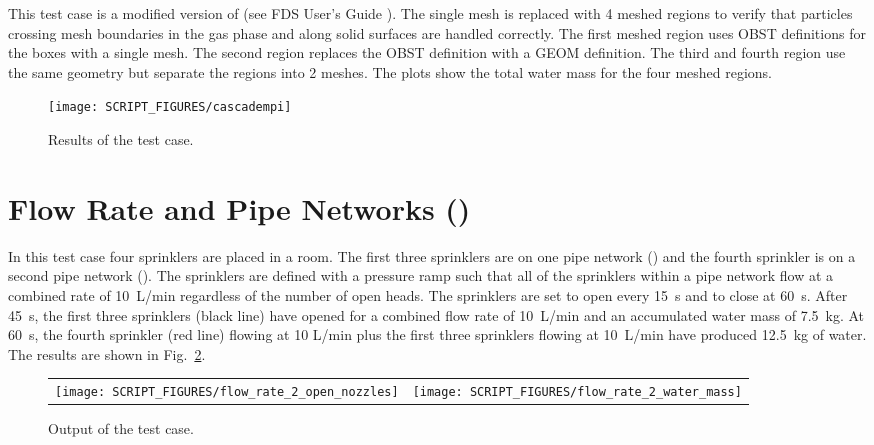 \documentclass[11pt]{book}
\begin{document}
This test case is a modified version of  (see FDS User's Guide \cite{FDS_Users_Guide}). The single mesh is replaced with 4 meshed regions to verify that particles crossing mesh boundaries in the gas phase and along solid surfaces are handled correctly. The first meshed region uses OBST definitions for the boxes with a single mesh. The second region replaces the OBST definition with a GEOM definition. The third and fourth region use the same geometry but separate the regions into 2 meshes. The plots show the total water mass for the four meshed regions.

\begin{figure}[ht]
\centering
\texttt{[image: SCRIPT\_FIGURES/cascadempi]}
\caption[Results of the  test case]{Results of the  test case.}
\label{cascadempi_image}
\end{figure}



\section{Flow Rate and Pipe Networks (\texorpdfstring{{}}{flow\_rate\_2}) }
\label{flow_rate_2}

In this test case four sprinklers are placed in a room.  The first three sprinklers are on one pipe network () and the fourth sprinkler is on a second pipe network ().  The sprinklers are defined with a pressure ramp such that all of the sprinklers within a pipe network flow at a combined rate of 10~L/min regardless of the number of open heads.  The sprinklers are set to open every 15~s and to close at 60~s.  After 45~s, the first three sprinklers (black line) have opened for a combined flow rate of 10~L/min and an accumulated water mass of 7.5~kg.  At 60~s, the fourth sprinkler (red line) flowing at 10 L/min plus the first three sprinklers flowing at 10~L/min have produced 12.5~kg of water. The results are shown in Fig.~\ref{flow_rate_2_figure}.

\begin{figure}[ht]
\begin{tabular*}{\textwidth}{lr}
\texttt{[image: SCRIPT\_FIGURES/flow\_rate\_2\_open\_nozzles]} &
\texttt{[image: SCRIPT\_FIGURES/flow\_rate\_2\_water\_mass]}
\end{tabular*}
\caption[The  case]{Output of the  test case.}
\label{flow_rate_2_figure}
\end{figure}
\end{document}
